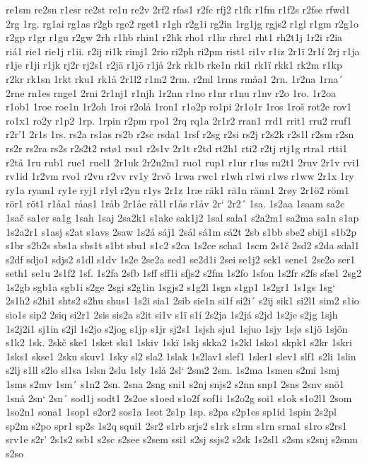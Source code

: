 re1sm
re2sn
r1esr
re2st
re1u
re2v
2rf2
rfas1
r2fc
rfj2
r1fk
r1fm
r1f2s
r2fse
rfwd1
2rg
1rg.
rg1ai
rg1as
r2gb
rge2
rget1
r1gh
r2g1i
rg2in
1rg1jg
rgjs2
r1gl
r1gm
r2g1o
r2gp
r1gr
r1gu
r2gw
2rh
r1hb
rhin1
r2hk
rho1
r1hr
rhrc1
rht1
rh2t1j
1r2i
r2ia
riá1
rie1
rie1j
r1ii.
r2ij
ri1k
rimj1
2rio
ri2ph
ri2pm
rist1
ri1v
r1iz
2r1ï
2r1í
2rj
r1ja
r1je
r1ji
r1jk
rj2r
rj2s1
r2jä
r1jö
r1jå
2rk
rk1b
rke1n
rki1
rk1ï
rkk1
rk2m
r1kp
r2kr
rk1sn
1rkt
rku1
rk1å
2r1l2
r1m2
2rm.
r2ml
1rms
rmåa1
2rn.
1r2na
1rna´
2rne
rn1es
rnge1
2rni
2r1nj1
r1njh
1r2nn
r1no
r1nr
r1nu
r1nv
r2o
1ro.
1r2oa
r1ob1
1roe
roe1n
1r2oh
1roi
r2olå
1ron1
r1o2p
ro1pi
2r1o1r
1ros
1roš
rot2e
rov1
ro1x1
ro2y
r1p2
1rp.
1rpin
r2pm
rpo1
2rq
rq1a
2r1r2
rran1
rrd1
rrit1
rru2
rruf1
r2r'1
2r1s
1rs.
rs2a
rs1as
rs2b
r2sc
rsda1
1rsf
r2sg
r2si
rs2j
r2s2k
r2s1l
r2sm
r2sn
rs2r
rs2ra
rs2s
r2s2t2
rstø1
rsu1
r2s1v
2r1t
r2td
rt2h1
rti2
r2tj
rtj1g
rtra1
rtti1
r2tå
1ru
rub1
rue1
ruel1
2r1uk
2r2u2m1
ruo1
rup1
r1ur
r1us
ru2t1
2ruv
2r1v
rvi1
rv1id
1r2vm
rvo1
r2vu
r2vv
rv1y
2rvö
1rwa
rwc1
r1wh
r1wi
r1ws
r1ww
2r1x
1ry
ry1a
ryam1
ry1e
ryj1
r1yl
r2yn
r1ys
2r1z
1ræ
räk1
rä1n
ränn1
2røy
2r1ö2
röm1
rör1
röt1
r1åa1
råas1
1råb
2r1åe
rå1l
r1ås
r1åv
2r`
2r2´
1sa.
1s2aa
1saam
sa2c
1sač
sa1er
sa1g
1sah
1saj
2sa2k1
s1ake
sak1j2
1sal
sala1
s2a2m1
sa2ma
sa1n
s1ap
1s2a2r1
s1asj
s2at
s1avs
2saw
1s2á
sáj1
2sál
sá1m
sá2t
2sb
s1bb
sbe2
sbij1
s1b2p
s1br
s2b2s
sbs1a
sbs1t
s1bt
sbu1
s1c2
s2ca
1s2ce
scha1
1scm
2s1č
2sd2
s2da
sdal1
s2df
sdjo1
sdjs2
s1dl
s1dv
1s2e
2se2a
sed1
se2d1i
2sei
se1j2
sek1
sene1
2se2o
ser1
seth1
se1u
2s1f2
1sf.
1s2fa
2sfb
1sff
sff1i
sfjs2
s2fm
1s2fo
1sfon
1s2fr
s2fs
sfæ1
2sg2
1s2gb
sgb1a
sgb1i
s2ge
2sgi
s2g1in
1sgjs2
s1g2l
1sgn
s1gp1
1s2gr1
1s1gs
1sg`
2s1h2
s2hi1
shts2
s2hu
shus1
1s2i
sia1
2sib
sie1n
si1f
si2i´
s2ij
sik1
si2l1
sim2
s1io
sio1s
sip2
2siq
si2r1
2sis
sis2a
s2it
si1v
s1ï
s1í
2s2ja
1s2já
s2jd
1s2je
s2jg
1sjh
1s2j2i1
sj1in
s2jl
1s2jo
s2jog
s1jp
s1jr
sj2s1
1sjsh
sju1
1sjuo
1sjy
1sjø
s1jö
1sjön
s1k2
1sk.
2skč
ske1
1sket
ski1
1skiv
1skï
1skj
skka2
1s2kl
1sko1
skpk1
s2kr
1skri
1sks1
skse1
2sku
skuv1
1sky
sl2
sla2
1slak
1s2lav1
slef1
1sler1
slev1
slf1
s2li
1slin
s2lj
s1ll
s2lo
sl1sa
1slsn
2slu
1sly
1slå
2sl`
2sm2
2sm.
1s2ma
1smen
s2mi
1smj
1sms
s2mv
1sm´
s1n2
2sn.
2sna
2sng
sni1
s2nj
snjs2
s2nn
snp1
2sns
2snv
snö1
1snå
2sn`
2sn´
sod1j
sodt1
2s2oe
s1oed
s1o2f
sof1i
1s2o2g
soi1
s1ok
s1o2l1
2som
1so2n1
sona1
1sop1
s2or2
sos1a
1sot
2s1p
1sp.
s2pa
s2p1es
sp1id
1spin
2s2pl
sp2m
s2po
spr1
sp2s
1s2q
squi1
2sr2
s1rb
srjs2
s1rk
s1rm
s1rn
srna1
s1ro
s2rs1
srv1e
s2r'
2s1s2
ssb1
s2sc
s2see
s2sem
ssi1
s2sj
ssjs2
s2sk
1s2sl1
s2sm
s2snj
s2snm
s2so
